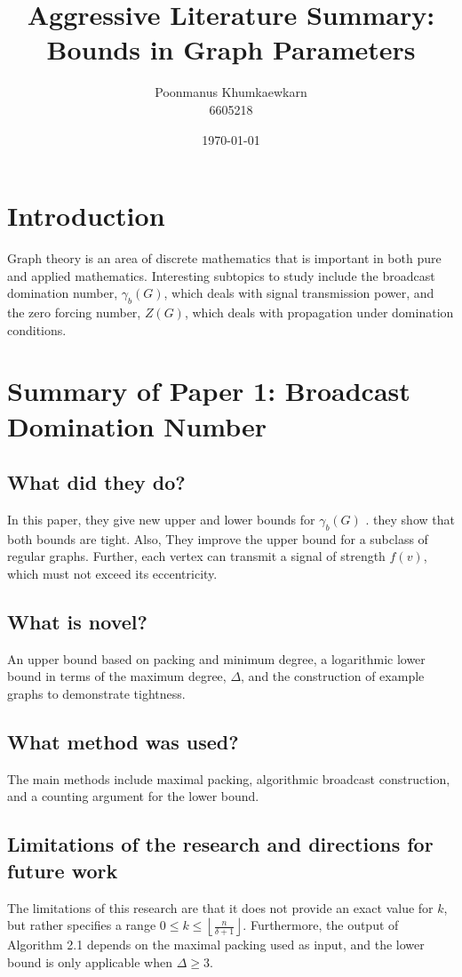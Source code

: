 \documentclass[12pt, a4paper]{article}
\title{Aggressive Literature Summary: Bounds in Graph Parameters}
\author{Poonmanus Khumkaewkarn \\ 6605218}
\date{\today}
\newcommand{\gb}{\gamma_b(G)}
\newcommand{\zg}{Z(G)}
\newcommand{\maxdeg}{\Delta} %
\newcommand{\mindeg}{\delta} %
\begin{document}
\maketitle


\section{Introduction}
Graph theory is an area of discrete mathematics that is important in both pure and applied mathematics. Interesting subtopics to study include the broadcast domination number, $\gb$, which deals with signal transmission power, and the zero forcing number, $\zg$, which deals with propagation under domination conditions.

\section{Summary of Paper 1: Broadcast Domination Number}

\subsection{What did they do?}
In this paper, they give new upper and lower bounds for $\gb$ \cite{paper1}. they show that both bounds are tight. Also, They improve the upper bound for a subclass of regular graphs. Further, each vertex can transmit a signal of strength $f(v)$, which must not exceed its eccentricity.

\subsection{What is novel?}
An upper bound based on packing and minimum degree, a logarithmic lower bound in terms of the maximum degree, $\maxdeg$, and the construction of example graphs to demonstrate tightness.

\subsection{What method was used?}
The main methods include maximal packing, algorithmic broadcast construction, and a counting argument for the lower bound.

\subsection{Limitations of the research and directions for future work}
The limitations of this research are that it does not provide an exact value for $k$, but rather specifies a range $0 \leq k \leq \left\lfloor \frac{n}{\mindeg + 1} \right\rfloor$. Furthermore, the output of Algorithm 2.1 depends on the maximal packing used as input, and the lower bound is only applicable when $\maxdeg \geq 3$.
\end{document}
